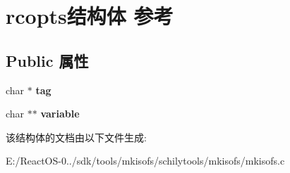 \hypertarget{structrcopts}{}\section{rcopts结构体 参考}
\label{structrcopts}
\subsection*{Public 属性}
\begin{DoxyCompactItemize}
\item 
\mbox{\label{structrcopts_a19ac5337992813c31902ca2b05c7957f}} 
char $\ast$ {\bfseries tag}
\item 
\mbox{\label{structrcopts_a8ccba1a24891c8bc7a147fe61291c144}} 
char $\ast$$\ast$ {\bfseries variable}
\end{DoxyCompactItemize}


该结构体的文档由以下文件生成\+:\begin{DoxyCompactItemize}
\item 
E\+:/\+React\+O\+S-\/0../sdk/tools/mkisofs/schilytools/mkisofs/mkisofs.\+c\end{DoxyCompactItemize}
